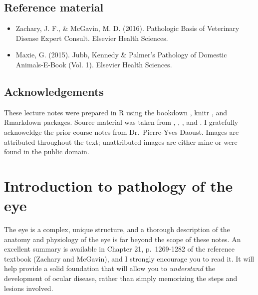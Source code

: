 \documentclass[openany]{book}
\providecommand{\tightlist}{%
  \setlength{\itemsep}{0pt}\setlength{\parskip}{0pt}}
\begin{document}
\section*{Reference material}\label{reference-material}

\begin{itemize}
\tightlist
\item
  Zachary, J. F., \& McGavin, M. D. (2016). Pathologic Basis of
  Veterinary Disease Expert Consult. Elsevier Health Sciences.
\item
  Maxie, G. (2015). Jubb, Kennedy \& Palmer's Pathology of Domestic
  Animals-E-Book (Vol. 1). Elsevier Health Sciences.
\end{itemize}

\section*{Acknowledgements}\label{acknowledgements}

These lecture notes were prepared in R \citep{R-base} using the bookdown
\citep{xie2015}, knitr \citep{R-knitr}, and Rmarkdown
\citep{R-rmarkdown} packages. Source material was taken from
\citet{zachary2016pathologic}, \citet{dubielzig}, \citet{histobasis},
and \citet{maxie2015jubb}. I gratefully acknoweldge the prior course
notes from Dr.~Pierre-Yves Daoust. Images are attributed throughout the
text; unattributed images are either mine or were found in the public
domain.

\chapter{Introduction to pathology of the eye}\label{intro}

The eye is a complex, unique structure, and a thorough description of
the anatomy and physiology of the eye is far beyond the scope of these
notes. An excellent summary is available in Chapter 21, p.~1269-1282 of
the reference textbook (Zachary and McGavin), and I strongly encourage
you to read it. It will help provide a solid foundation that will allow
you to \emph{understand} the development of ocular disease, rather than
simply memorizing the steps and lesions involved.
\end{document}
